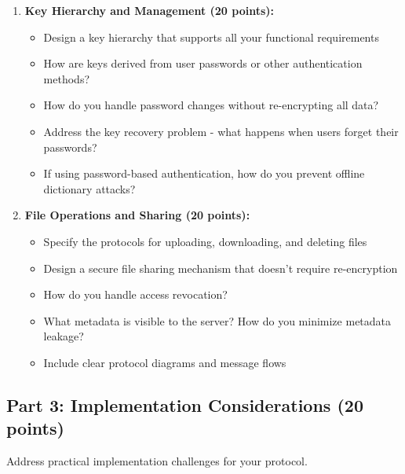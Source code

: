 \documentclass[10pt,a4paper,american]{article}
\begin{document}
\begin{enumerate}
	\item \textbf{Key Hierarchy and Management (20 points):}
	      \begin{itemize}
		      \item Design a key hierarchy that supports all your functional requirements
		      \item How are keys derived from user passwords or other authentication methods?
		      \item How do you handle password changes without re-encrypting all data?
		      \item Address the key recovery problem - what happens when users forget their passwords?
		      \item If using password-based authentication, how do you prevent offline dictionary attacks?
	      \end{itemize}

	\item \textbf{File Operations and Sharing (20 points):}
	      \begin{itemize}
		      \item Specify the protocols for uploading, downloading, and deleting files
		      \item Design a secure file sharing mechanism that doesn't require re-encryption
		      \item How do you handle access revocation?
		      \item What metadata is visible to the server? How do you minimize metadata leakage?
		      \item Include clear protocol diagrams and message flows
	      \end{itemize}
\end{enumerate}

\subsection{Part 3: Implementation Considerations (20 points)}

Address practical implementation challenges for your protocol.
\end{document}

